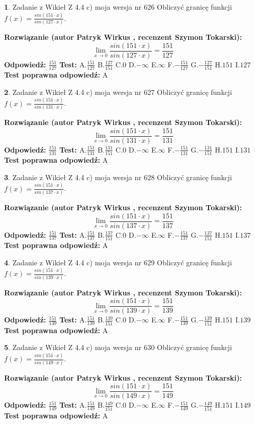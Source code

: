 \documentclass[12pt, a4paper]{article}
\theoremstyle{definition} %
\newtheorem{zad}{}
\newcommand{\zadStart}[1]{\begin{zad}#1\newline}
\newcommand{\zadStop}{\end{zad}}
\newcommand{\rozwStart}[2]{\noindent \textbf{Rozwiązanie (autor #1 , recenzent #2): }\newline}
\newcommand{\rozwStop}{\newline}
\newcommand{\odpStart}{\noindent \textbf{Odpowiedź:}\newline}
\newcommand{\odpStop}{\newline}
\newcommand{\testStart}{\noindent \textbf{Test:}\newline}
\newcommand{\testStop}{\newline}
\newcommand{\kluczStart}{\noindent \textbf{Test poprawna odpowiedź:}\newline}
\newcommand{\kluczStop}{\newline}
\begin{document}
\zadStart{Zadanie z Wikieł Z 4.4 c) moja wersja nr 626}
Obliczyć granicę funkcji $f(x)=\frac{sin(151\cdot x)}{sin(127\cdot x)}$.
\zadStop
\rozwStart{Patryk Wirkus}{Szymon Tokarski}
$$\lim\limits_{x\to 0}\frac{sin(151\cdot x)}{sin(127\cdot x)}=
\frac{151}{127}$$
\rozwStop
\odpStart
$\frac{151}{127}$
\odpStop
\testStart
A.$\frac{151}{127}$
B.$\frac{127}{151}$
C.$0$
D.$-\infty$
E.$\infty$
F.$-\frac{151}{127}$
G.$-\frac{127}{151}$
H.$151$
I.$127$
\testStop
\kluczStart
A
\kluczStop



\zadStart{Zadanie z Wikieł Z 4.4 c) moja wersja nr 627}
Obliczyć granicę funkcji $f(x)=\frac{sin(151\cdot x)}{sin(131\cdot x)}$.
\zadStop
\rozwStart{Patryk Wirkus}{Szymon Tokarski}
$$\lim\limits_{x\to 0}\frac{sin(151\cdot x)}{sin(131\cdot x)}=
\frac{151}{131}$$
\rozwStop
\odpStart
$\frac{151}{131}$
\odpStop
\testStart
A.$\frac{151}{131}$
B.$\frac{131}{151}$
C.$0$
D.$-\infty$
E.$\infty$
F.$-\frac{151}{131}$
G.$-\frac{131}{151}$
H.$151$
I.$131$
\testStop
\kluczStart
A
\kluczStop



\zadStart{Zadanie z Wikieł Z 4.4 c) moja wersja nr 628}
Obliczyć granicę funkcji $f(x)=\frac{sin(151\cdot x)}{sin(137\cdot x)}$.
\zadStop
\rozwStart{Patryk Wirkus}{Szymon Tokarski}
$$\lim\limits_{x\to 0}\frac{sin(151\cdot x)}{sin(137\cdot x)}=
\frac{151}{137}$$
\rozwStop
\odpStart
$\frac{151}{137}$
\odpStop
\testStart
A.$\frac{151}{137}$
B.$\frac{137}{151}$
C.$0$
D.$-\infty$
E.$\infty$
F.$-\frac{151}{137}$
G.$-\frac{137}{151}$
H.$151$
I.$137$
\testStop
\kluczStart
A
\kluczStop



\zadStart{Zadanie z Wikieł Z 4.4 c) moja wersja nr 629}
Obliczyć granicę funkcji $f(x)=\frac{sin(151\cdot x)}{sin(139\cdot x)}$.
\zadStop
\rozwStart{Patryk Wirkus}{Szymon Tokarski}
$$\lim\limits_{x\to 0}\frac{sin(151\cdot x)}{sin(139\cdot x)}=
\frac{151}{139}$$
\rozwStop
\odpStart
$\frac{151}{139}$
\odpStop
\testStart
A.$\frac{151}{139}$
B.$\frac{139}{151}$
C.$0$
D.$-\infty$
E.$\infty$
F.$-\frac{151}{139}$
G.$-\frac{139}{151}$
H.$151$
I.$139$
\testStop
\kluczStart
A
\kluczStop



\zadStart{Zadanie z Wikieł Z 4.4 c) moja wersja nr 630}
Obliczyć granicę funkcji $f(x)=\frac{sin(151\cdot x)}{sin(149\cdot x)}$.
\zadStop
\rozwStart{Patryk Wirkus}{Szymon Tokarski}
$$\lim\limits_{x\to 0}\frac{sin(151\cdot x)}{sin(149\cdot x)}=
\frac{151}{149}$$
\rozwStop
\odpStart
$\frac{151}{149}$
\odpStop
\testStart
A.$\frac{151}{149}$
B.$\frac{149}{151}$
C.$0$
D.$-\infty$
E.$\infty$
F.$-\frac{151}{149}$
G.$-\frac{149}{151}$
H.$151$
I.$149$
\testStop
\kluczStart
A
\kluczStop
\end{document}
